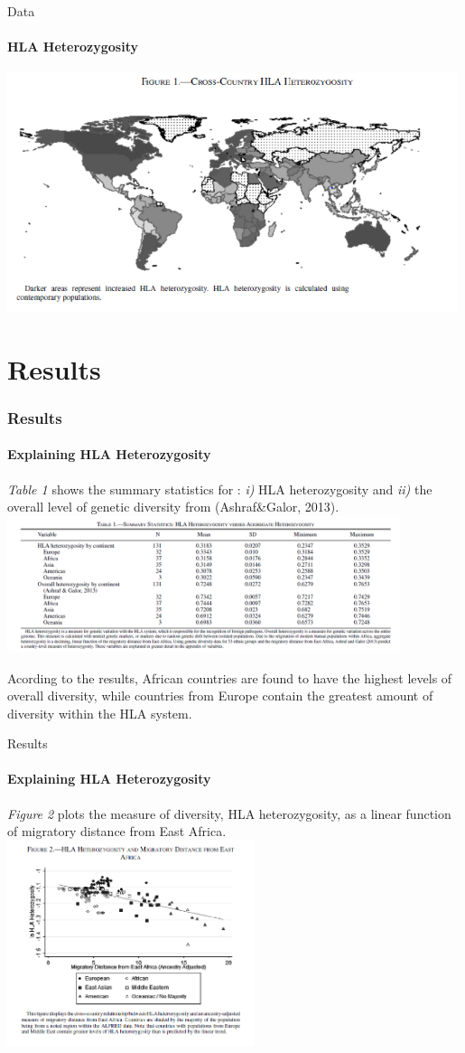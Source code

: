 \documentclass[pdftex,12pt,xcolor=pdftex,table]{beamer}
\theoremstyle{definition}
\theoremstyle{remark}
\numberwithin{equation}{section}
\numberwithin{figure}{section}
\begin{document}
\begin{frame}{Data}
\framesubtitle{HLA Heterozygosity}
\includegraphics[height=7cm]{Figure_1.png}
\centering
\end{frame}


\section{Results}
\begin{frame}
\frametitle{Results}
\framesubtitle{Explaining HLA Heterozygosity}
\justifying
\textit{Table 1} shows the summary statistics for : \textit{i)} HLA heterozygosity and \textit{ii)} the overall level of genetic diversity from (Ashraf\&Galor, 2013)\cite{ashraf2013out}.\\ 
\includegraphics[height=4cm]{Table_1.PNG}

\justifying
Acording to the results, African countries are found to have the highest levels of overall diversity, while countries from Europe contain the greatest amount of diversity within the HLA system.
\end{frame}

\begin{frame}{Results}
\framesubtitle{Explaining HLA Heterozygosity}
\justifying
\textit{Figure 2} plots the measure of diversity, HLA heterozygosity, as a linear function of migratory distance from East Africa. 
\\ 
\includegraphics[height=6cm]{Figure_2.PNG}
\centering
\end{frame}
\end{document}
